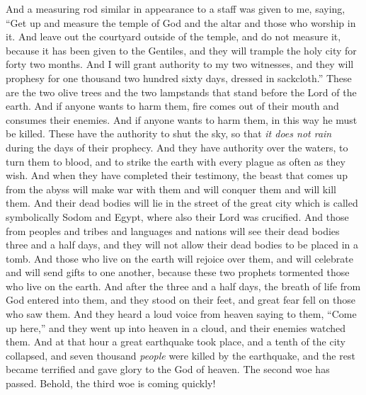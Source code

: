 \begin{biblechapter} %
 And a measuring rod similar in appearance to a staff was given to me, saying, “Get up and measure the temple of God and the altar and those who worship in it.
\verse And leave out the courtyard outside of the temple, and do not measure it, because it has been given to the Gentiles, and they will trample the holy city for forty two months.
\verse And I will grant authority to my two witnesses, and they will prophesy for one thousand two hundred sixty days, dressed in sackcloth.”
\verse These are the two olive trees and the two lampstands that stand before the Lord of the earth.
\verse And if anyone wants to harm them, fire comes out of their mouth and consumes their enemies. And if anyone wants to harm them, in this way he must be killed.
\verse These have the authority to shut the sky, so that \textit{it does not rain} during the days of their prophecy. And they have authority over the waters, to turn them to blood, and to strike the earth with every plague as often as they wish.
\verse And when they have completed their testimony, the beast that comes up from the abyss will make war with them and will conquer them and will kill them.
\verse And their dead bodies will lie in the street of the great city which is called symbolically Sodom and Egypt, where also their Lord was crucified.
\verse And those from peoples and tribes and languages and nations will see their dead bodies three and a half days, and they will not allow their dead bodies to be placed in a tomb.
\verse And those who live on the earth will rejoice over them, and will celebrate and will send gifts to one another, because these two prophets tormented those who live on the earth.
\verse And after the three and a half days, the breath of life from God entered into them, and they stood on their feet, and great fear fell on those who saw them.
\verse And they heard a loud voice from heaven saying to them, “Come up here,” and they went up into heaven in a cloud, and their enemies watched them.
\verse And at that hour a great earthquake took place, and a tenth of the city collapsed, and seven thousand \textit{people} were killed by the earthquake, and the rest became terrified and gave glory to the God of heaven.
\verse The second woe has passed. Behold, the third woe is coming quickly!

\end{biblechapter}
